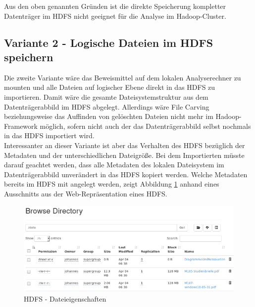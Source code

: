 \noindent
Aus den oben genannten Gründen ist die direkte Speicherung kompletter Datenträger im HDFS nicht geeignet für die Analyse im Hadoop-Cluster.

\subsection{Variante 2 - Logische Dateien im HDFS speichern}
Die zweite Variante wäre das Beweismittel auf dem lokalen Analyserechner zu mounten und alle Dateien auf logischer Ebene direkt in das HDFS zu importieren. 
Damit wäre die gesamte Dateisystemstruktur aus dem Datenträgerabbild im HDFS abgelegt. Allerdings wäre File Carving beziehungsweise das Auffinden von gelöschten Dateien nicht mehr im Hadoop-Framework möglich, sofern nicht auch der das Datenträgerabbild selbst nochmals in das HDFS importiert wird.\\ 

\noindent
Interessanter an dieser Variante ist aber das Verhalten des HDFS bezüglich der Metadaten und der unterschiedlichen Dateigröße. Bei dem Importierten müsste darauf geachtet werden, dass alle Metadaten des lokalen Dateisystem im Datenträgerabbild unverändert in das HDFS kopiert werden. 
Welche Metadaten bereits im HDFS mit angelegt werden, zeigt Abbildung \ref{fig:hdfs_file_properties} anhand eines Ausschnitts aus der Web-Repräsentation eines HDFS.\\
\begin{figure}[ht]
  \centering
  \includegraphics[width=\textwidth]{./resource/HDFS_FS_Example.png}
  \caption{HDFS - Dateieigenschaften}
  \label{fig:hdfs_file_properties}
\end{figure}

